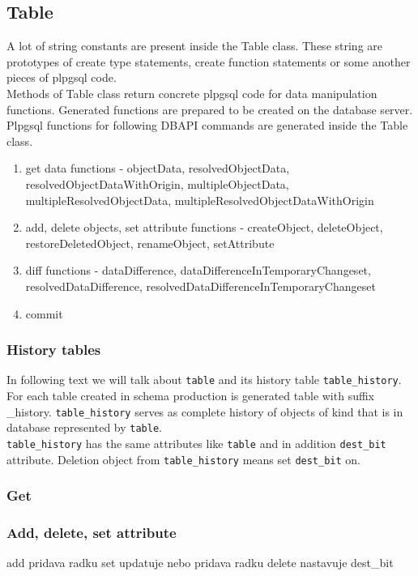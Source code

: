 \documentclass[deska]{subfiles}
\begin{document}
\subsection{Table}
A lot of string constants are present inside the Table class. These string are prototypes of create type statements, create function statements or some another pieces of plpgsql code.\\
Methods of Table class return concrete plpgsql code for data manipulation functions. Generated functions are prepared to be created on the database server.\\
Plpgsql functions for following DBAPI commands are generated inside the Table class.

\begin{enumerate}
	\item get data functions - objectData, resolvedObjectData, resolvedObjectDataWithOrigin, multipleObjectData, multipleResolvedObjectData, multipleResolvedObjectDataWithOrigin
	\item add, delete objects, set attribute functions - createObject, deleteObject, restoreDeletedObject, renameObject, setAttribute
	\item diff functions - dataDifference, dataDifferenceInTemporaryChangeset, resolvedDataDifference, resolvedDataDifferenceInTemporaryChangeset
	\item commit
\end{enumerate}

\subsubsection{History tables}
In following text we will talk about {\tt table} and its history table {\tt table\_history}.\\
For each table created in schema production is generated table with suffix \_history. {\tt table\_history} serves as complete history of objects of kind that is in database represented by {\tt table}.\\
{\tt table\_history} has the same attributes like {\tt table} and in addition {\tt dest\_bit} attribute. Deletion object from {\tt table\_history} means set {\tt dest\_bit} on.

\subsubsection{Get}

\subsubsection{Add, delete, set attribute}
add pridava radku
set updatuje nebo pridava radku
delete nastavuje dest\_bit
\end{document}
